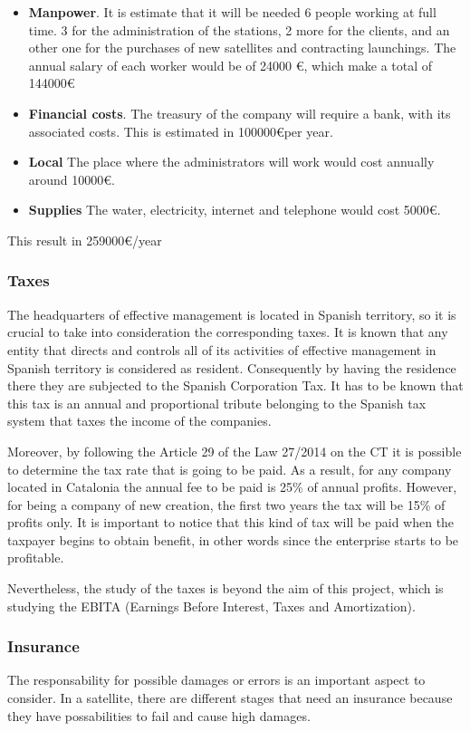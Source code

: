\begin{itemize}
\item \textbf{Manpower}. It is estimate that it will be needed 6 people working at full time. 3 for the administration of the stations, 2 more for the clients, and an other one for the purchases of new satellites and contracting launchings. The annual salary of each worker would be of 24000 \euro, which make a total of 144000\euro
\item \textbf{Financial costs}. The treasury of the company will require a  bank, with its associated costs. This is estimated in 100000\euro  per year.
\item \textbf{Local} The place where the administrators will work would cost annually around 10000\euro .
\item \textbf{Supplies} The water, electricity, internet and telephone would cost 5000\euro .
\end{itemize}

This result in 259000\euro/year

\subsubsection{Taxes}
The headquarters of effective management is located in Spanish territory, so it is crucial to take into consideration the corresponding taxes. It is known that any entity that directs and controls all of its activities of effective management in Spanish territory is considered as resident. Consequently by having the residence there they are subjected to the Spanish Corporation Tax. It has to be known that this tax is an annual and proportional tribute belonging to the Spanish tax system that taxes the income of the companies.

Moreover, by following the Article 29 of the Law 27/2014 on the CT it is possible to determine the tax rate that is going to be paid. As a result, for any company located in Catalonia the annual fee to be paid is 25\% of annual profits. However, for being a company of new creation, the first two years the tax will be 15\% of profits only. It is important to notice that this kind of tax will be paid when the taxpayer begins to obtain benefit, in other words since the enterprise starts to be profitable. 

Nevertheless, the study of the taxes is beyond the aim of this project, which is studying the EBITA (Earnings Before Interest, Taxes and Amortization).
  
\subsubsection{Insurance}
The responsability for possible damages or errors is an important aspect to consider. In a satellite, there are different stages that need an insurance because they have possabilities to fail and cause high damages.

